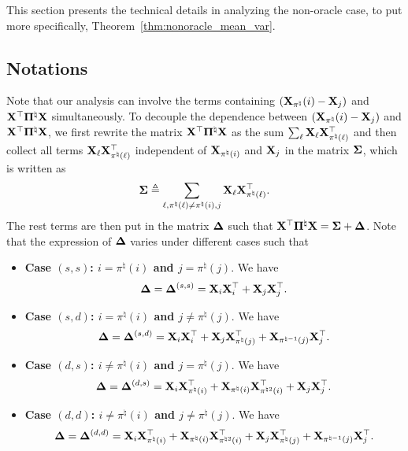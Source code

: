 \documentclass[11pt]{article}
\begin{document}
This section presents the technical details
in analyzing the non-oracle case, to put more specifically, Theorem~\ref{thm:nonoracle_mean_var}.

\subsection{Notations}
Note that our analysis can involve the terms
containing $\left(\mathbf{X}_{\pi^{\natural}}(i) - \mathbf{X}_j\right)$
and $\mathbf{X}^{\top}\boldsymbol{\Pi}^{\natural}\mathbf{X}$ simultaneously.
To decouple the dependence between
$\left(\mathbf{X}_{\pi^{\natural}}(i) - \mathbf{X}_j\right)$ and
$\mathbf{X}^{\top}\boldsymbol{\Pi}^{\natural}\mathbf{X}$, we first rewrite the matrix
$\mathbf{X}^{\top}\boldsymbol{\Pi}^{\natural}\mathbf{X}$ as the sum
$\sum_{\ell} \mathbf{X}_{\ell}\mathbf{X}_{\pi^{\natural}(\ell)}^{\top}$
and then collect all terms $\mathbf{X}_{\ell} \mathbf{X}_{\pi^{\natural}(\ell)}^{\top}$
independent of $\mathbf{X}_{\pi^{\natural}(i)}$ and $\mathbf{X}_j$ in
the matrix $\boldsymbol{\Sigma}$, which is written as
\begin{align}
\label{eq:sigma_matrix_def}
\boldsymbol{\Sigma} \triangleq \sum_{\ell, \pi^{\natural}(\ell) \neq \pi^{\natural}(i), j}
\mathbf{X}_{\ell}\mathbf{X}_{\pi^{\natural}(\ell)}^{\top}.
\end{align}
The rest terms are then put in the matrix $\boldsymbol{\Delta}$ such that
$\mathbf{X}^{\top}\boldsymbol{\Pi}^{\natural}\mathbf{X} = \boldsymbol{\Sigma} + \boldsymbol{\Delta}$. Note that
the expression of $\boldsymbol{\Delta}$ varies under different cases such that
\begin{itemize}[leftmargin=*]
\item
\textbf{Case $(s, s)$: $i = \pi^{\natural}(i)$ and $j = \pi^{\natural}(j)$}.
We have
\begin{align}
\label{eq:bdelta_ss_def}
\boldsymbol{\Delta} = \boldsymbol{\Delta}^{(s,s)}= \mathbf{X}_i \mathbf{X}_i^{\top} + \mathbf{X}_j \mathbf{X}_j^{\top}.
\end{align}
\item
\textbf{Case $(s, d)$: $i = \pi^{\natural}(i)$ and $j \neq \pi^{\natural}(j)$}.
We have
\begin{align}
\label{eq:bdelta_sd_def}
\boldsymbol{\Delta} = \boldsymbol{\Delta}^{(s, d)} =  \mathbf{X}_{i}\mathbf{X}_{i}^{\top}
+ \mathbf{X}_{j}\mathbf{X}_{\pi^{\natural}(j)}^{\top} +
\mathbf{X}_{\pi^{\natural -1}(j)}\mathbf{X}_{j}^{\top}.
\end{align}
\item
\textbf{Case $(d, s)$: $i\neq \pi^{\natural}(i)$ and $j = \pi^{\natural}(j)$}.
We have
\begin{align}
\label{eq:bdelta_ds_def}
\boldsymbol{\Delta} = \boldsymbol{\Delta}^{(d, s)} = \mathbf{X}_{i}\mathbf{X}_{\pi^{\natural}(i)}^{\top}
+ \mathbf{X}_{\pi^{\natural}(i)}\mathbf{X}_{\pi^{\natural 2}(i)}^{\top}
+ \mathbf{X}_{j}\mathbf{X}_{j}^{\top}.
\end{align}
\item
\textbf{Case $(d, d)$: $i \neq \pi^{\natural}(i)$ and $j\neq \pi^{\natural}(j)$}.
We have
\begin{align}
\label{eq:bdelta_dd_def}
\boldsymbol{\Delta} = \boldsymbol{\Delta}^{(d,d)} = \mathbf{X}_{i}\mathbf{X}_{\pi^{\natural}(i)}^{\top}
+ \mathbf{X}_{\pi^{\natural}(i)}\mathbf{X}_{\pi^{\natural 2}(i)}^{\top}
+ \mathbf{X}_{j}\mathbf{X}_{\pi^{\natural}(j)}^{\top} +
\mathbf{X}_{\pi^{\natural -1}(j)}\mathbf{X}_{j}^{\top}.
\end{align}
\end{itemize}
\end{document}
